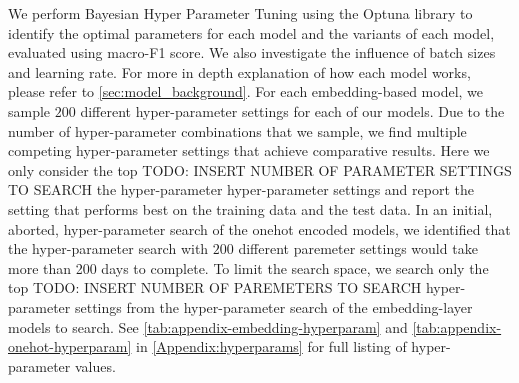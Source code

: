 We perform Bayesian Hyper Parameter Tuning using the Optuna library \cite{Optuna:2019} to identify the optimal parameters for each model and the variants of each model, evaluated using macro-F1 score. We also investigate the influence of batch sizes and learning rate. For more in depth explanation of how each model works, please refer to \autoref{sec:model_background}.\vspace{5mm}
For each embedding-based model, we sample $200$ different hyper-parameter settings for each of our models. Due to the number of hyper-parameter combinations that we sample, we find multiple competing hyper-parameter settings that achieve comparative results. Here we only consider the top TODO: INSERT NUMBER OF PARAMETER SETTINGS TO SEARCH the hyper-parameter hyper-parameter settings and report the setting that performs best on the training data and the test data. In an initial, aborted, hyper-parameter search of the onehot encoded models, we identified that the hyper-parameter search with $200$ different paremeter settings would take more than 200 days to complete.
To limit the search space, we search only the top TODO: INSERT NUMBER OF PAREMETERS TO SEARCH hyper-parameter settings from the hyper-parameter search of the embedding-layer models to search. See \autoref{tab:appendix-embedding-hyperparam} and \autoref{tab:appendix-onehot-hyperparam} in \autoref{Appendix:hyperparams} for full listing of hyper-parameter values.

